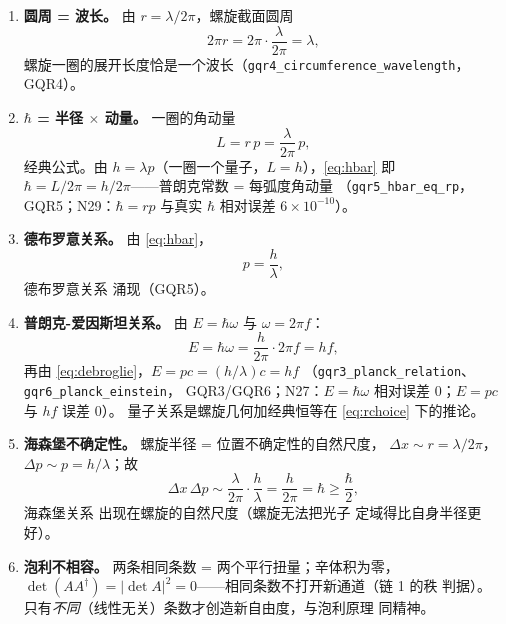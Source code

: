 \documentclass[aps,prd,preprint,superscriptaddress,amsmath,amssymb]{revtex4-2}
\begin{document}
\begin{enumerate}
\item \textbf{圆周 = 波长。} 由 $r=\lambda/2\pi$，螺旋截面圆周
\begin{equation}
2\pi r=2\pi\cdot\frac{\lambda}{2\pi}=\lambda,
\label{eq:circ}
\end{equation}
螺旋一圈的展开长度恰是一个波长（\texttt{gqr4\_circumference\_wavelength}，
GQR4）。
\item \textbf{$\hbar$ = 半径 $\times$ 动量。} 一圈的角动量
\begin{equation}
L=r\,p=\frac{\lambda}{2\pi}\,p,
\label{eq:hbar}
\end{equation}
经典公式。由 $h=\lambda p$（一圈一个量子，$L=h$），\eqref{eq:hbar}
即 $\hbar=L/2\pi=h/2\pi$——普朗克常数 = 每弧度角动量
（\texttt{gqr5\_hbar\_eq\_rp}，GQR5；N29：$\hbar=rp$ 与真实 $\hbar$
相对误差 $6\times10^{-10}$）。
\item \textbf{德布罗意关系。} 由 \eqref{eq:hbar}，
\begin{equation}
p=\frac{h}{\lambda},
\label{eq:debroglie}
\end{equation}
德布罗意关系 \cite{de1924recherches} 涌现（GQR5）。
\item \textbf{普朗克-爱因斯坦关系。} 由 $E=\hbar\omega$ 与
$\omega=2\pi f$：
\begin{equation}
E=\hbar\omega=\frac{h}{2\pi}\cdot 2\pi f=hf,
\label{eq:planck}
\end{equation}
再由 \eqref{eq:debroglie}，$E=pc=(h/\lambda)c=hf$
（\texttt{gqr3\_planck\_relation}、\texttt{gqr6\_planck\_einstein}，
GQR3/GQR6；N27：$E=\hbar\omega$ 相对误差 0；$E=pc$ 与 $hf$ 误差 0）。
量子关系是螺旋几何加经典恒等在 \eqref{eq:rchoice} 下的推论。
\item \textbf{海森堡不确定性。} 螺旋半径 = 位置不确定性的自然尺度，
$\Delta x\sim r=\lambda/2\pi$，$\Delta p\sim p=h/\lambda$；故
\begin{equation}
\Delta x\,\Delta p\sim\frac{\lambda}{2\pi}\cdot\frac{h}{\lambda}
=\frac{h}{2\pi}=\hbar\ge\frac{\hbar}{2},
\label{eq:heisenberg}
\end{equation}
海森堡关系 \cite{heisenberg1927anschaulichen} 出现在螺旋的自然尺度（螺旋无法把光子
定域得比自身半径更好）。
\item \textbf{泡利不相容。} 两条相同条数 = 两个平行扭量；辛体积为零，
$\det(AA^\dagger)=|\det A|^2=0$——相同条数不打开新通道（链 1 的秩
判据）。只有\emph{不同}（线性无关）条数才创造新自由度，与泡利原理
\cite{pauli1925zusammenhang} 同精神。
\end{enumerate}
\end{document}
